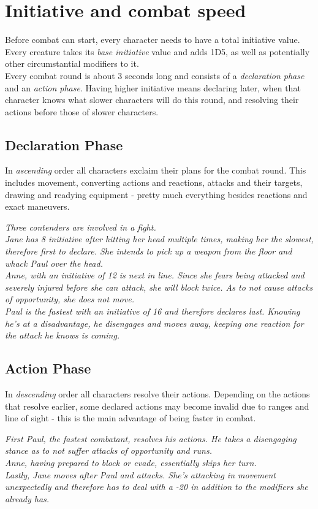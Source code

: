 \section{Initiative and combat speed}
Before combat can start, every character needs to have a total initiative value.
Every creature takes its \emph{base initiative} value
	and adds 1D5,
	as well as potentially other circumstantial modifiers to it.\\
Every combat round is about 3 seconds long and consists of a \textit{declaration phase} and an \textit{action phase}. Having higher initiative means declaring later, when that character knows what slower characters will do this round, and resolving their actions before those of slower characters.
\subsection{Declaration Phase}
In \emph{ascending} order all characters exclaim their plans for the combat round. This includes movement, converting actions and reactions, attacks and their targets, drawing and readying equipment - pretty much everything besides reactions and exact maneuvers.
\begin{exampleblock}
	\itshape
	Three contenders are involved in a fight.\\
	Jane has 8 initiative after hitting her head multiple times, making her the slowest, therefore first to declare. She intends to pick up a weapon from the floor and whack Paul over the head.\\
	Anne, with an initiative of 12 is next in line. Since she fears being attacked and severely injured before she can attack, she will block twice. As to not cause attacks of opportunity, she does not move.\\
	Paul is the fastest with an initiative of 16 and therefore declares last. Knowing he's at a disadvantage, he disengages and moves away, keeping one reaction for the attack he knows is coming.
\end{exampleblock}
\subsection{Action Phase}
In \emph{descending} order all characters resolve their actions. Depending on the actions that resolve earlier, some declared actions may become invalid due to ranges and line of sight - this is the main advantage of being faster in combat.
\begin{exampleblock}
	\itshape
	First Paul, the fastest combatant, resolves his actions. He takes a disengaging stance as to not suffer attacks of opportunity and runs.\\
	Anne, having prepared to block or evade, essentially skips her turn.\\
	Lastly, Jane moves after Paul and attacks. She's attacking in movement unexpectedly and therefore has to deal with a -20 in addition to the modifiers she already has.
\end{exampleblock}
